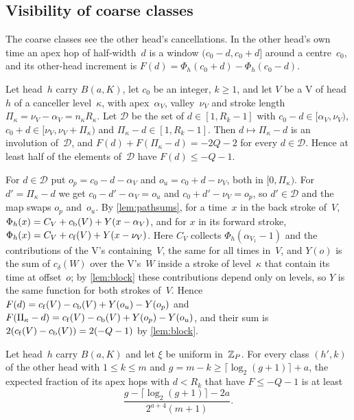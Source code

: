 \subsection{Visibility of coarse classes}\label{sec:dnp-visible}

The coarse classes see the other head's cancellations. In the other head's own time an apex hop of half-width~$d$ is a
window $(c_0-d,c_0+d]$ around a centre~$c_0$, and its other-head increment is $F(d)=\Phi_h(c_0+d)-\Phi_h(c_0-d)$.

\begin{lemma}\label{lem:straddle}
\notformalized
Let head~$h$ carry $B(a,K)$, let $c_0$ be an integer, $k\ge1$, and let $V$ be a V of head~$h$ of a canceller level~$\kappa$,
with apex~$\alpha_V$, valley~$\nu_V$ and stroke length $\Pi_\kappa=\nu_V-\alpha_V=n_\kappa R_\kappa$. Let $\mathcal D$ be the
set of $d\in[1,R_k-1]$ with $c_0-d\in[\alpha_V,\nu_V)$, $c_0+d\in[\nu_V,\nu_V+\Pi_\kappa)$ and $\Pi_\kappa-d\in[1,R_k-1]$.
Then $d\mapsto\Pi_\kappa-d$ is an involution of~$\mathcal D$, and $F(d)+F(\Pi_\kappa-d)=-2Q-2$ for every $d\in\mathcal D$.
Hence at least half of the elements of~$\mathcal D$ have $F(d)\le-Q-1$.
\end{lemma}

\begin{informalproof}
For $d\in\mathcal D$ put $o_p=c_0-d-\alpha_V$ and $o_u=c_0+d-\nu_V$, both in $[0,\Pi_\kappa)$. For $d'=\Pi_\kappa-d$ we get
$c_0-d'-\alpha_V=o_u$ and $c_0+d'-\nu_V=o_p$, so $d'\in\mathcal D$ and the map swaps $o_p$ and~$o_u$. By \cref{lem:pathsums},
for a time~$x$ in the back stroke of~$V$, $\Phi_h(x)=C_V+c_{\mathrm{b}}(V)+Y(x-\alpha_V)$, and for $x$ in its forward stroke,
$\Phi_h(x)=C_V+c_{\mathrm{f}}(V)+Y(x-\nu_V)$. Here $C_V$ collects $\Phi_h(\alpha_{V_1}-1)$ and the contributions of the V's
containing~$V$, the same for all times in~$V$, and $Y(o)$ is the sum of $c_\delta(W)$ over the V's~$W$ inside a stroke of
level~$\kappa$ that contain its time at offset~$o$; by \cref{lem:block} these contributions depend only on levels, so $Y$ is
the same function for both strokes of~$V$. Hence $F(d)=c_{\mathrm{f}}(V)-c_{\mathrm{b}}(V)+Y(o_u)-Y(o_p)$ and
$F(\Pi_\kappa-d)=c_{\mathrm{f}}(V)-c_{\mathrm{b}}(V)+Y(o_p)-Y(o_u)$, and their sum is $2(c_{\mathrm{f}}(V)-c_{\mathrm{b}}(V))=2(-Q-1)$ by
\cref{lem:block}.
\end{informalproof}

\begin{theorem}\label{thm:V}
\notformalized
Let head~$h$ carry $B(a,K)$ and let $\xi$ be uniform in~$\mathbb{Z}_P$. For every class $(h',k)$ of the other head with
$1\le k\le m$ and $g=m-k\ge\lceil\log_2(g+1)\rceil+a$, the expected fraction of its apex hops with $d<R_k$ that have
$F\le-Q-1$ is at least
\[
  \frac{g-\lceil\log_2(g+1)\rceil-2a}{2^{a+4}(m+1)}.
\]
\end{theorem}

